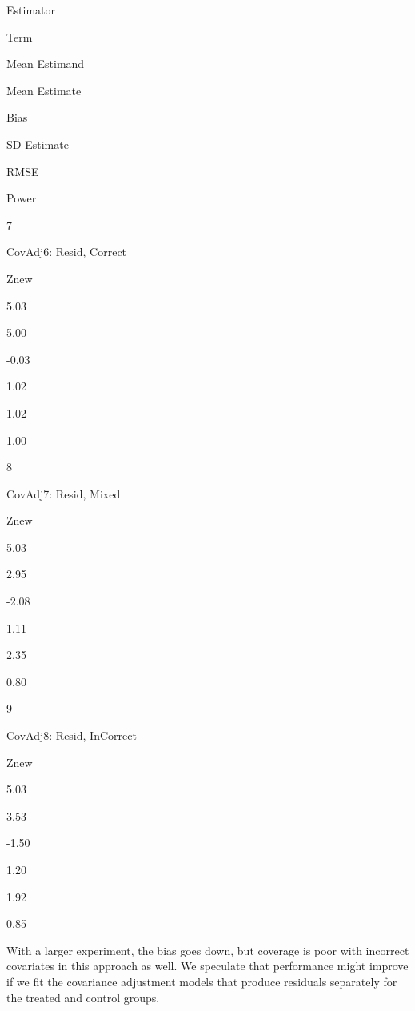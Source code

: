 \documentclass[
  12pt,
]{book}
\newenvironment{Shaded}{\begin{snugshade}}{\end{snugshade}}
\newcommand{\CommentTok}[1]{\textcolor[rgb]{0.56,0.35,0.01}{\textit{#1}}}
\newcommand{\DecValTok}[1]{\textcolor[rgb]{0.00,0.00,0.81}{#1}}
\newcommand{\KeywordTok}[1]{\textcolor[rgb]{0.13,0.29,0.53}{\textbf{#1}}}
\newcommand{\NormalTok}[1]{#1}
\newcommand{\OperatorTok}[1]{\textcolor[rgb]{0.81,0.36,0.00}{\textbf{#1}}}
\theoremstyle{definition}
\theoremstyle{definition}
\theoremstyle{definition}
\theoremstyle{remark}
\begin{document}
\begin{Shaded}
\end{Shaded}

Estimator

Term

Mean Estimand

Mean Estimate

Bias

SD Estimate

RMSE

Power

7

CovAdj6: Resid, Correct

Znew

5.03

5.00

-0.03

1.02

1.02

1.00

8

CovAdj7: Resid, Mixed

Znew

5.03

2.95

-2.08

1.11

2.35

0.80

9

CovAdj8: Resid, InCorrect

Znew

5.03

3.53

-1.50

1.20

1.92

0.85

With a larger experiment, the bias goes down, but coverage is poor with
incorrect covariates in this approach as well. We speculate that
performance might improve if we fit the covariance adjustment models
that produce residuals separately for the treated and control groups.
\end{document}
